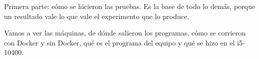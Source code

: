 Primera parte: cómo se hicieron las pruebas. Es la base de todo lo demás, porque un resultado vale lo que vale el experimento que lo produce.

Vamos a ver las máquinas, de dónde salieron los programas, cómo se corrieron con Docker y sin Docker, qué es el programa del equipo y qué se hizo en el i5-10400.
